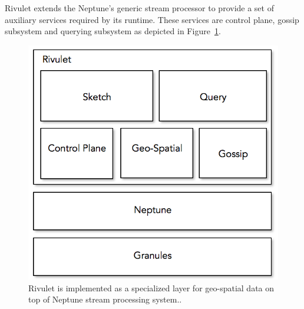 Rivulet extends the Neptune's generic stream processor to provide a set of auxiliary services required by its runtime.
These services are control plane, gossip subsystem and querying subsystem as depicted in Figure~\ref{fig:rivulet-archi}.
%
\begin{figure}
    \centerline{\includegraphics[scale=0.5]{figures/rivulet-archi.png}}
    \caption{Rivulet is implemented as a specialized layer for geo-spatial data on top of Neptune stream processing system..}
    \label{fig:rivulet-archi}
\end{figure}
%
